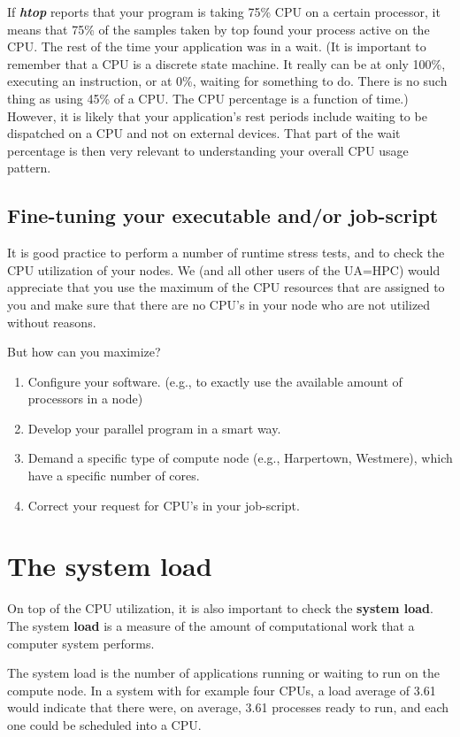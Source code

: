 If \textbf{\textit{htop}} reports that your program is taking 75\% CPU on a certain processor, it means that 75\% of the samples taken by top found your process active on the CPU. The rest of the time your application was in a wait. (It is important to remember that a CPU is a discrete state machine. It really can be at only 100\%, executing an instruction, or at 0\%, waiting for something to do. There is no such thing as using 45\% of a CPU. The CPU percentage is a function of time.) However, it is likely that your application's rest periods include waiting to be dispatched on a CPU and not on external devices. That part of the wait percentage is then very relevant to understanding your overall CPU usage pattern.

\subsection{Fine-tuning your executable and/or job-script}

It is good practice to perform a number of runtime stress tests, and to check the CPU utilization of your nodes. We (and all other users of the UA=HPC) would appreciate that you use the maximum of the CPU resources that are assigned to you and make sure that there are no CPU's in your node who are not utilized without reasons.

But how can you maximize?

\begin{enumerate}
\item  Configure your software. (e.g., to exactly use the available amount of processors in a node)
\item  Develop your parallel program in a smart way.
\item  Demand a specific type of compute node (e.g., Harpertown, Westmere), which have a specific number of cores.
\item  Correct your request for CPU's in your job-script.
\end{enumerate}

\section{The system load}

On top of the CPU utilization, it is also important to check the \textbf{system load}.  The system \textbf{load} is a measure of the amount of computational work that a computer system performs.

The system load is the number of applications running or waiting to run on the compute node.  In a system with for example four CPUs, a load average of 3.61 would indicate that there were, on average, 3.61 processes ready to run, and each one could be scheduled into a CPU.

